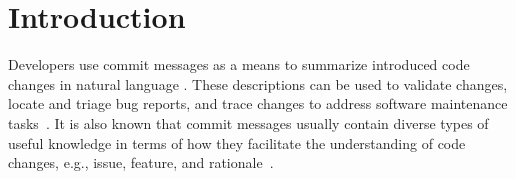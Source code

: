 \documentclass[smallextended]{svjour3}       %
\newcommand\raula[1]{\nb{Raula}{\color{red}#1}}
\newcommand{\nb}[2]{
	{
		{\color{black}{
				\fbox{\bfseries\sffamily\scriptsize#1}
				{\sffamily$\triangleright~${\it\sffamily #2}$~\triangleleft$}
	}}}
}
\begin{document}
\section{Introduction}
Developers use commit messages as a means to summarize introduced code changes in natural language \citep{mockus2000identifying, buse2010automatically}.
These descriptions can be used to validate changes, locate and triage bug reports, and trace changes to address software maintenance tasks~\citep{girba2005developers, hassan2008road, d2010commit}.
It is also known that commit messages usually contain diverse types of useful knowledge in terms of how they facilitate the understanding of code changes, e.g., issue, feature, and rationale~\citep{mockus2000identifying, fu2015automated, sarwar2020multi}. 
\end{document}
